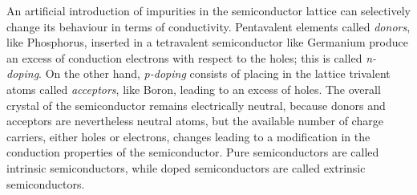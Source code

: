 An artificial introduction of impurities in the semiconductor lattice can selectively change its behaviour in terms of conductivity.
Pentavalent elements called \textit{donors}, like Phosphorus, inserted in a tetravalent semiconductor like Germanium produce an excess of conduction electrons with respect to the holes; this is called \textit{n-doping}. On the other hand, \textit{p-doping} consists of placing in the lattice trivalent atoms called \textit{acceptors}, like Boron, leading to an excess of holes. The overall crystal of the semiconductor remains electrically neutral, because donors and acceptors are nevertheless neutral atoms, but the available number of charge carriers, either holes or electrons, changes leading to a modification in the conduction properties of the semiconductor. Pure semiconductors are called intrinsic semiconductors, while doped semiconductors are called extrinsic semiconductors. \cite{libro-detectors}

